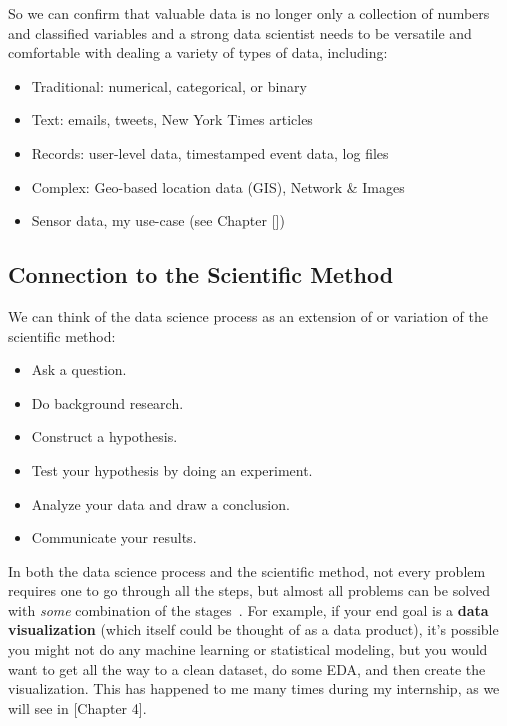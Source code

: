 So we can confirm that valuable data is no longer only a collection of numbers and classified variables and 
a strong data scientist needs to be versatile and comfortable with dealing a variety of types of data, including:
\begin{itemize}
    \item Traditional: numerical, categorical, or binary
    \item Text: emails, tweets, New York Times articles
    \item Records: user-level data, timestamped event data, log files
    \item Complex: Geo-based location data (GIS), Network \& Images
    \item Sensor data, my use-case (see Chapter [])
\end{itemize}

\subsection{Connection to the Scientific Method}
We can think of the data science process as an extension of or variation of the scientific method:
\begin{itemize}
    \item Ask a question.
    \item Do background research.
    \item Construct a hypothesis.
    \item Test your hypothesis by doing an experiment.
    \item Analyze your data and draw a conclusion.
    \item Communicate your results.
\end{itemize}
In both the data science process and the scientific method, not every problem requires one to go through all the steps, but almost all problems can be solved with \textit{some} combination of the stages~\cite{Book:doing_data_science}.
For example, if your end goal is a \textbf{data visualization} (which itself could be thought of as a data product), it’s possible you might not do any machine learning or statistical modeling,
but you would want to get all the way to a clean dataset, do some \acl{EDA}, and then create the visualization. This has happened to me many times during my internship, as we will see in [Chapter 4].